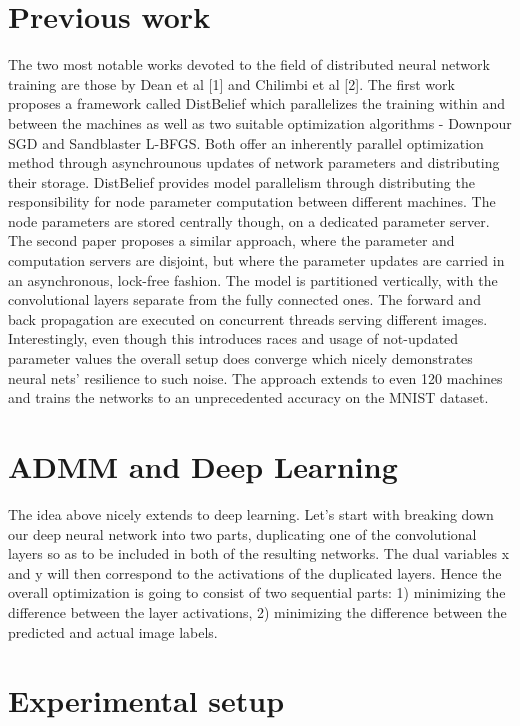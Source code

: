 \documentclass[conference]{IEEEtran}
\begin{document}
\section{Previous work}

The two most notable works devoted to the field of distributed neural network training are those by Dean et al [1] and Chilimbi et al [2]. The first work proposes a framework called DistBelief which parallelizes the training within and between the machines as well as two suitable optimization algorithms - Downpour SGD and Sandblaster L-BFGS. Both offer an inherently parallel optimization method through asynchrounous updates of network parameters and distributing their storage. DistBelief provides model parallelism through distributing the responsibility for node parameter computation between different machines. The node parameters are stored centrally though, on a dedicated parameter server.
The second paper proposes a similar approach, where the parameter and computation servers are disjoint, but where the parameter updates are carried in an asynchronous, lock-free fashion. The model is partitioned vertically, with the convolutional layers separate from the fully connected ones. The forward and back propagation are executed on concurrent threads serving different images. Interestingly, even though this introduces races and usage of not-updated parameter values the overall setup does converge which nicely demonstrates neural nets' resilience to such noise. The approach extends to even 120 machines and trains the networks to an unprecedented accuracy on the MNIST dataset.

\section{ADMM and Deep Learning}

The idea above nicely extends to deep learning. Let's start with breaking down our deep neural network into two parts, duplicating one of the convolutional layers so as to be included in both of the resulting networks. The dual variables x and y will then correspond to the activations of the duplicated layers. Hence the overall optimization is going to consist of two sequential parts: 1) minimizing the difference between the layer activations, 2) minimizing the difference between the predicted and actual image labels.

\section{Experimental setup}
\end{document}
